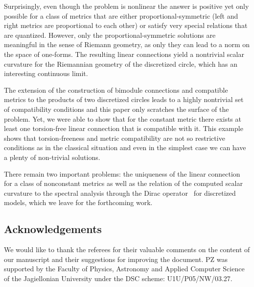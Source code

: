 \documentclass[10pt,a4paper]{amsart}
\numberwithin{equation}{section}
\begin{document}
Surprisingly, even though the problem is nonlinear the answer is positive yet only possible for a class of metrics that are either
proportional-symmetric (left and right metrics are proportional to each other) or satisfy very special relations that are quantized.
However, only the proportional-symmetric solutions are meaningful in the sense of Riemann geometry, as only they can lead
to a norm on the space of one-forms. The resulting linear connections yield a nontrivial scalar curvature for the Riemannian
geometry of the discretized circle, which has an interesting continuous limit.

The extension of the construction of bimodule connections and compatible metrics to the products
of two discretized circles leads to a highly nontrivial set of compatibility conditions and this paper
only scratches the surface of the problem. Yet, we were able to show that for the constant metric
there exists at least one torsion-free linear connection that is compatible with it. This example shows that torsion-freeness and
metric compatibility are not so restrictive conditions as in the classical situation and even in the simplest case we can have
a plenty of non-trivial solutions.

There remain two important problems: the uniqueness of the linear connection for a class of
nonconstant metrics as well as the relation of the computed scalar curvature to the spectral
analysis through the Dirac operator~\cite{Ba15,BG19,Gl17} for discretized models, which we leave
for the forthcoming work.

\subsection*{Acknowledgements}
We would like to thank the referees for their valuable comments on the content of our manuscript and their suggestions for improving the document. PZ was supported by the Faculty of Physics, Astronomy and Applied Computer Science of the Jagiellonian University under the DSC scheme: U1U/P05/NW/03.27.

\end{document}
